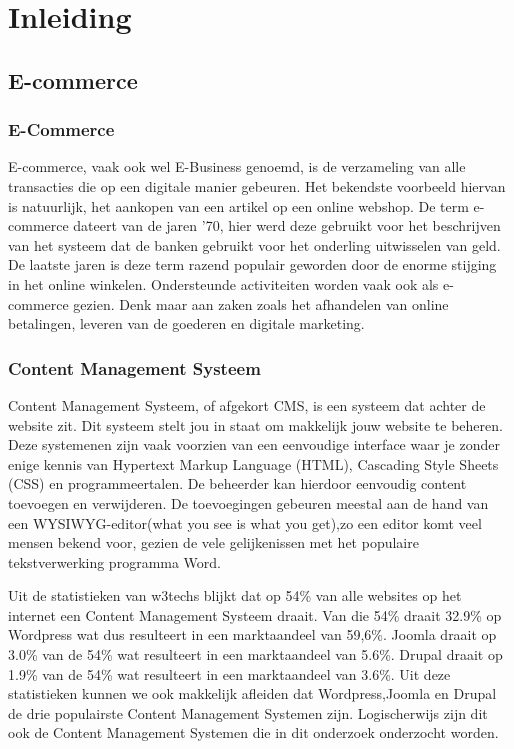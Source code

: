 
\chapter{Inleiding}
\label{ch:inleiding}

\section{E-commerce}
\label{sec:E-commerce}
\subsection{E-Commerce}
E-commerce, vaak ook wel E-Business genoemd, is de verzameling van alle transacties die op een digitale manier gebeuren. Het bekendste voorbeeld hiervan is natuurlijk, het aankopen van een artikel op een online webshop. De term e-commerce dateert van de jaren '70, hier werd deze gebruikt voor het beschrijven van het systeem dat de banken gebruikt voor het onderling uitwisselen van geld. De laatste jaren is deze term razend populair geworden door de enorme stijging in het online winkelen. Ondersteunde activiteiten worden vaak ook als e-commerce gezien. Denk maar aan zaken zoals het afhandelen van online betalingen, leveren van de goederen en digitale marketing. \autocite{Termen2018}

\subsection{Content Management Systeem}
Content Management Systeem, of afgekort CMS, is een systeem dat achter de website zit. Dit systeem stelt jou in staat om makkelijk jouw website te beheren. Deze systemenen zijn vaak voorzien van een eenvoudige interface waar je zonder enige kennis van Hypertext Markup Language (HTML), Cascading Style Sheets (CSS) en programmeertalen. De beheerder kan hierdoor eenvoudig content toevoegen en verwijderen. De toevoegingen gebeuren meestal aan de hand van een WYSIWYG-editor(what you see is what you get),zo een editor komt veel mensen bekend voor, gezien de vele gelijkenissen met het populaire tekstverwerking programma Word. \autocite{forresult2014,wphandleiding2015}


Uit de statistieken van w3techs blijkt dat op 54\% van alle websites op het internet een Content Management Systeem draait.  Van die 54\% draait 32.9\% op Wordpress wat dus resulteert in een marktaandeel van 59,6\%. Joomla draait op 3.0\% van de 54\% wat resulteert in een marktaandeel van 5.6\%. Drupal draait op 1.9\% van de 54\% wat resulteert in een marktaandeel van 3.6\%. Uit deze statistieken kunnen we ook makkelijk afleiden dat Wordpress,Joomla en Drupal de drie populairste Content Management Systemen zijn. Logischerwijs zijn dit ook de Content Management Systemen die in dit onderzoek onderzocht worden.


